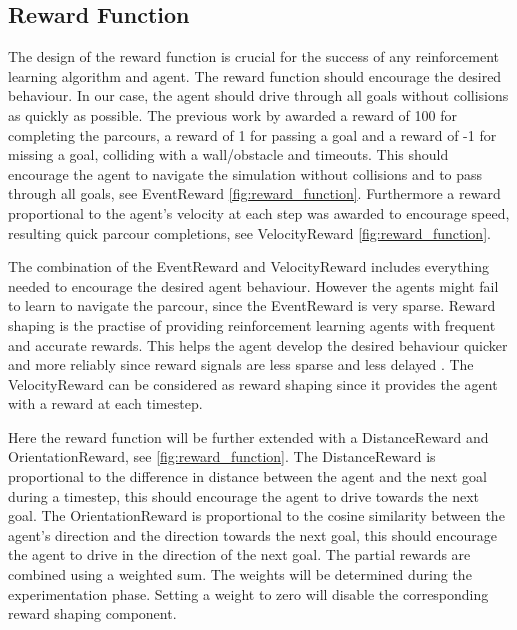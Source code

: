 \subsection{Reward Function}

The design of the reward function is crucial for the success of any reinforcement learning algorithm and agent. The reward function should encourage the desired behaviour. In our case, the agent should drive through all goals without collisions as quickly as possible. The previous work by \autocite{maximilian} awarded a reward of 100 for completing the parcours, a reward of 1 for passing a goal and a reward of -1 for missing a goal, colliding with a wall/obstacle and timeouts. This should encourage the agent to navigate the simulation without collisions and to pass through all goals, see EventReward \ref{fig:reward_function}. Furthermore a reward proportional to the agent's velocity at each step was awarded to encourage speed, resulting quick parcour completions, see VelocityReward \ref{fig:reward_function}.

The combination of the EventReward and VelocityReward includes everything needed to encourage the desired agent behaviour. However the agents might fail to learn to navigate the parcour, since the EventReward is very sparse. Reward shaping is the practise of providing reinforcement learning agents with frequent and accurate rewards. This helps the agent develop the desired behaviour quicker and more reliably since reward signals are less sparse and less delayed \autocite{drl_for_ad}. The VelocityReward can be considered as reward shaping since it provides the agent with a reward at each timestep.

Here the reward function will be further extended with a DistanceReward and OrientationReward, see \ref{fig:reward_function}. The DistanceReward is proportional to the difference in distance between the agent and the next goal during a timestep, this should encourage the agent to drive towards the next goal. The OrientationReward is proportional to the cosine similarity between the agent's direction and the direction towards the next goal, this should encourage the agent to drive in the direction of the next goal. The partial rewards are combined using a weighted sum. The weights will be determined during the experimentation phase. Setting a weight to zero will disable the corresponding reward shaping component.


